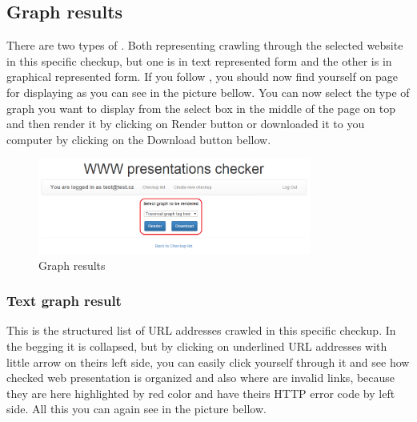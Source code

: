 \documentclass[12pt,a4paper]{article}
\begin{document}
\subsection{Graph results} \label{graph}
There are two types of . Both representing crawling through the selected website in this specific checkup, but one  is in text represented form and the other  is in graphical represented form. If you follow , you should now find yourself on page for displaying  as you can see in the picture bellow. You can now select the type of graph you want to display from the select box in the middle of the page on top and then render it by clicking on Render button or downloaded it to you computer by clicking on the Download button bellow.

\begin{figure}[H]
    \centering
    \includegraphics[width=0.8\textwidth]{pictures/graph.png}
		\caption{Graph results}
		\label{fig:graph}
\end{figure}

\subsubsection{Text graph result} \label{text}
This is the structured list of URL addresses crawled in this specific checkup. In the begging it is collapsed, but by clicking on underlined URL addresses with little arrow on theirs left side, you can easily click yourself through it and see how checked web presentation is organized and also where are invalid links, because they are here highlighted by red color and have theirs HTTP error code by left side. All this you can again see in the picture bellow.
\end{document}
